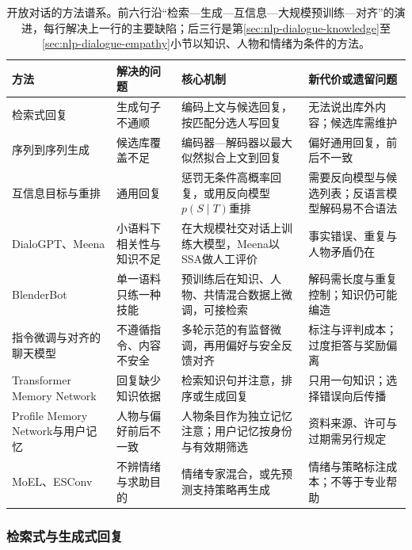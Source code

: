 \begin{table}[htbp]
  \centering
  \small
  \setlength{\tabcolsep}{3pt}
  \renewcommand{\tabularxcolumn}[1]{>{\raggedright\arraybackslash}p{#1}}
  \begin{tabularx}{\linewidth}{@{}>{\raggedright\arraybackslash}p{30mm}XXX@{}}
    \toprule
    方法 & 解决的问题 & 核心机制 & 新代价或遗留问题\\
    \midrule
    检索式回复 & 生成句子不通顺 & 编码上文与候选回复，按匹配分选人写回复 & 无法说出库外内容；候选库需维护\\
    \addlinespace
    序列到序列生成 & 候选库覆盖不足 & 编码器—解码器以最大似然拟合上文到回复 & 偏好通用回复，前后不一致\\
    \addlinespace
    互信息目标与重排 & 通用回复 & 惩罚无条件高概率回复，或用反向模型$p(S\mid T)$重排 & 需要反向模型与候选列表；反语言模型解码易不合语法\\
    \addlinespace
    DialoGPT、Meena & 小语料下相关性与知识不足 & 在大规模社交对话上训练大模型，Meena以SSA做人工评价 & 事实错误、重复与人物矛盾仍在\\
    \addlinespace
    BlenderBot & 单一语料只练一种技能 & 预训练后在知识、人物、共情混合数据上微调，可接检索 & 解码需长度与重复控制；知识仍可能编造\\
    \addlinespace
    指令微调与对齐的聊天模型 & 不遵循指令、内容不安全 & 多轮示范的有监督微调，再用偏好与安全反馈对齐 & 标注与评判成本；过度拒答与奖励偏离\\
    \addlinespace
    Transformer Memory Network & 回复缺少知识依据 & 检索知识句并注意，排序或生成回复 & 只用一句知识；选择错误向后传播\\
    \addlinespace
    Profile Memory Network与用户记忆 & 人物与偏好前后不一致 & 人物条目作为独立记忆注意；用户记忆按身份与有效期筛选 & 资料来源、许可与过期需另行规定\\
    \addlinespace
    MoEL、ESConv & 不辨情绪与求助目的 & 情绪专家混合，或先预测支持策略再生成 & 情绪与策略标注成本；不等于专业帮助\\
    \bottomrule
  \end{tabularx}
  \caption{开放对话的方法谱系。前六行沿“检索—生成—互信息—大规模预训练—对齐”的演进，每行解决上一行的主要缺陷；后三行是第\ref{sec:nlp-dialogue-knowledge}至\ref{sec:nlp-dialogue-empathy}小节以知识、人物和情绪为条件的方法。}
  \label{tab:nlp-dialogue-open-lineage}
\end{table}

\subsubsection{检索式与生成式回复}
\label{sec:nlp-dialogue-retrieval-generation}

